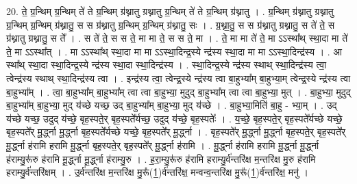 \documentclass[17pt]{extarticle}
\begin{document}
20. ते॒ ग्र॒न्थिम् ग्र॒न्थिम् ते॑ ते ग्र॒न्थिम् ग्र॑थ्नातु ग्रथ्नातु ग्र॒न्थिम् ते॑ ते ग्र॒न्थिम् ग्र॑थ्नातु । . ग्र॒न्थिम् ग्र॑थ्नातु ग्रथ्नातु ग्र॒न्थिम् ग्र॒न्थिम् ग्र॑थ्नातु॒ स स ग्र॑थ्नातु ग्र॒न्थिम् ग्र॒न्थिम् ग्र॑थ्नातु॒ सः । . ग्र॒थ्ना॒तु॒ स स ग्र॑थ्नातु ग्रथ्नातु॒ स ते॑ ते॒ स ग्र॑थ्नातु ग्रथ्नातु॒ स ते᳚ । . स ते॑ ते॒ स स ते॒ मा मा ते॒ स स ते॒ मा । . ते॒ मा मा ते॑ ते॒ मा ऽऽस्था᳚थ् स्था॒दा मा ते॑ ते॒ मा ऽऽस्था᳚त् । . मा ऽऽस्था᳚थ् स्था॒दा मा मा ऽऽस्था॒दिन्द्र॒स्ये न्द्र॑स्य स्था॒दा मा मा ऽऽस्था॒दिन्द्र॑स्य । . आ स्था᳚थ् स्था॒दा स्था॒दिन्द्र॒स्ये न्द्र॑स्य स्था॒दा स्था॒दिन्द्र॑स्य । . स्था॒दिन्द्र॒स्ये न्द्र॑स्य स्थाथ् स्था॒दिन्द्र॑स्य त्वा॒ त्वेन्द्र॑स्य स्थाथ् स्था॒दिन्द्र॑स्य त्वा । . इन्द्र॑स्य त्वा॒ त्वेन्द्र॒स्ये न्द्र॑स्य त्वा बा॒हुभ्या᳚म् बा॒हुभ्या॒म् त्वेन्द्र॒स्ये न्द्र॑स्य त्वा बा॒हुभ्या᳚म् । . त्वा॒ बा॒हुभ्या᳚म् बा॒हुभ्या᳚म् त्वा त्वा बा॒हुभ्या॒ मुदुद् बा॒हुभ्या᳚म् त्वा त्वा बा॒हुभ्या॒ मुत् । . बा॒हुभ्या॒ मुदुद् बा॒हुभ्या᳚म् बा॒हुभ्या॒ मुद् य॑च्छे यच्छ॒ उद् बा॒हुभ्या᳚म् बा॒हुभ्या॒ मुद् य॑च्छे । . बा॒हुभ्या॒मिति॑ बा॒हु - भ्या॒म् । . उद् य॑च्छे यच्छ॒ उदुद् य॑च्छे॒ बृह॒स्पते॒र् बृह॒स्पते᳚र्यच्छ॒ उदुद् य॑च्छे॒ बृह॒स्पतेः᳚ । . य॒च्छे॒ बृह॒स्पते॒र् बृह॒स्पते᳚र्यच्छे यच्छे॒ बृह॒स्पते᳚र् मू॒र्द्ध्ना मू॒र्द्ध्ना बृह॒स्पते᳚र्यच्छे यच्छे॒ बृह॒स्पते᳚र् मू॒र्द्ध्ना । . बृह॒स्पते᳚र् मू॒र्द्ध्ना मू॒र्द्ध्ना बृह॒स्पते॒र् बृह॒स्पते᳚र् मू॒र्द्ध्ना ह॑रामि हरामि मू॒र्द्ध्ना बृह॒स्पते॒र् बृह॒स्पते᳚र् मू॒र्द्ध्ना ह॑रामि । . मू॒र्द्ध्ना ह॑रामि हरामि मू॒र्द्ध्ना मू॒र्द्ध्ना ह॑राम्यु॒रू॑रु ह॑रामि मू॒र्द्ध्ना मू॒र्द्ध्ना ह॑राम्यु॒रु । . ह॒रा॒म्यु॒रू॑रु ह॑रामि हराम्यु॒र्व॑न्तरि॑क्ष म॒न्तरि॑क्ष मु॒रु ह॑रामि हराम्यु॒र्व॑न्तरि॑क्षम् । . उ॒र्व॑न्तरि॑क्ष म॒न्तरि॑क्ष मु॒रू᳚(1॒)र्व॑न्तरि॑क्ष॒ मन्वन्व॒न्तरि॑क्ष मु॒रू᳚(1॒)र्व॑न्तरि॑क्ष॒ मनु॑ । \newline
\end{document}
